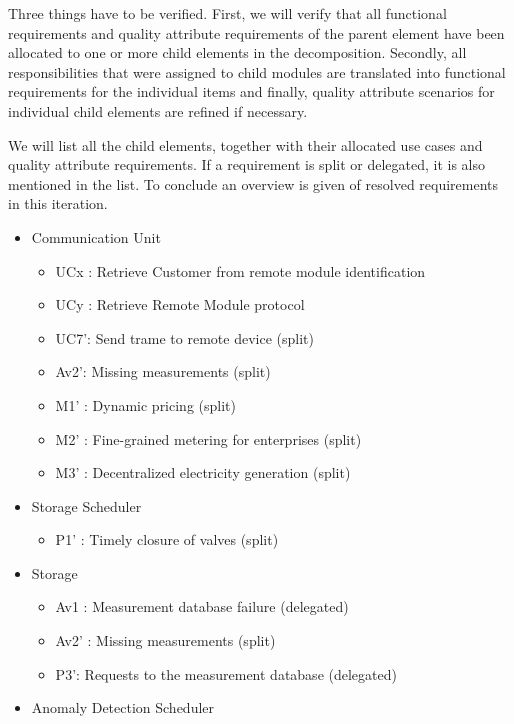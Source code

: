 \npar Three things have to be verified. First, we will verify that all
functional requirements and quality attribute requirements of the parent element
have been allocated to one or more child elements in the decomposition.
Secondly, all responsibilities that were assigned to child modules are
translated into functional requirements for the individual items and finally,
quality attribute scenarios for individual child elements are refined if
necessary.

\npar We will list all the child elements, together with their allocated use
cases and quality attribute requirements. If a requirement is split or
delegated, it is also mentioned in the list. To conclude an overview is given of
resolved requirements in this iteration.

\begin{itemize}
	\item Communication Unit
	\begin{itemize}
	  	\item UCx : Retrieve Customer from remote module identification %
	  	\item UCy : Retrieve Remote Module protocol
		\item UC7': Send trame to remote device (split)
		\item Av2': Missing measurements (split)
		\item M1' : Dynamic pricing (split)
		\item M2' : Fine-grained metering for enterprises (split)
		\item M3' : Decentralized electricity generation (split)
	\end{itemize}
	\item Storage Scheduler
	\begin{itemize}
		\item P1' : Timely closure of valves (split)
	\end{itemize}
	\item Storage
	\begin{itemize}
		\item Av1 : Measurement database failure (delegated)
		\item Av2' : Missing measurements (split)
	  	\item P3': Requests to the measurement database (delegated)
	\end{itemize}
	\item Anomaly Detection Scheduler

\end{itemize}
